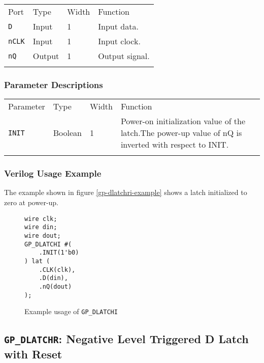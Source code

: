 \documentclass[11pt]{article}
\newcommand{\tokenstyle}[1]{\texttt{#1}}
\newcommand{\whenstyle}[1]{{\fontseries{sb}\selectfont#1}}
\newcommand{\thinhline}{\Xhline{1\arrayrulewidth}}
\newcommand{\thickhline}{\Xhline{2.5\arrayrulewidth}}
\begin{document}
\begin{tabularx}{\textwidth}{lllX}
\thinhline
\whenstyle{Port} & \whenstyle{Type} & \whenstyle{Width} & \whenstyle{Function} \\
\thickhline
\tokenstyle{D} & Input & 1 & Input data. \\
\thinhline
\tokenstyle{nCLK} & Input & 1 & Input clock. \\
\thinhline
\tokenstyle{nQ} & Output & 1 & Output signal. \\
\thinhline
\end{tabularx}

\subsubsection{Parameter Descriptions}

\begin{tabularx}{\textwidth}{lllX}
\thinhline
\whenstyle{Parameter} & \whenstyle{Type} & \whenstyle{Width} & \whenstyle{Function} \\
\thickhline
\tokenstyle{INIT} & Boolean & 1 & Power-on initialization value of the latch.\newline The power-up value of nQ is
inverted with respect to INIT.\\
\thinhline
\end{tabularx}

\subsubsection{Verilog Usage Example}

The example shown in figure \ref{gp-dlatchri-example} shows a latch initialized to zero at power-up.

\begin{figure}[h]
\begin{lstlisting}
wire clk;
wire din;
wire dout;
GP_DLATCHI #(
	.INIT(1'b0)
) lat (
	.CLK(clk),
	.D(din),
	.nQ(dout)
);
\end{lstlisting}
\caption{Example usage of \tokenstyle{GP\_DLATCHI}}
\label{gp-dlatchi-example}
\end{figure}


\pagebreak
\subsection{\tokenstyle{GP\_DLATCHR}: Negative Level Triggered D Latch with Reset}
\label{gp-latchr}
\end{document}
